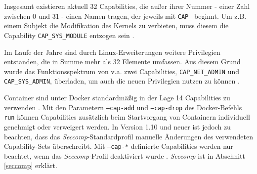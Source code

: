 \documentclass[../main.tex]{subfiles}
\begin{document}
			Insgesamt existieren aktuell 32 Capabilities, die außer ihrer Nummer - einer Zahl zwischen 0 und 31 - einen Namen tragen, der jeweils mit \texttt{CAP\_} beginnt. Um z.B. einem Subjekt die Modifikation des Kernels zu verbieten, muss diesem die Capability \texttt{CAP\_SYS\_MODULE} entzogen sein \cite[S.42]{SELinuxApparmor}.

			Im Laufe der Jahre sind durch Linux-Erweiterungen weitere Privilegien entstanden, die in Summe mehr als 32 Elemente umfassen. Aus diesem Grund wurde das Funktionsspektrum von v.a. zwei Capabilities, \texttt{CAP\_NET\_ADMIN} und \texttt{CAP\_SYS\_ADMIN}, überladen, um auch die neuen Privilegien nutzen zu können \cite[S.40f.]{SELinuxApparmor}.

			Container sind unter Docker standardmäßig in der Lage 14 Capabilities zu verwenden \cite{githubCapabilities}. Mit den Parametern \texttt{--cap-add} und \texttt{--cap-drop} des Docker-Befehls \texttt{run} können Capabilities zusätzlich beim Startvorgang von Containern individuell genehmigt oder verweigert werden. In Version 1.10 und neuer ist jedoch zu beachten, dass das \emph{Seccomp}-Standardprofil manuelle Änderungen des verwendeten Capability-Sets überschreibt. Mit \texttt{--cap-*} definierte Capabilities werden nur beachtet, wenn das \emph{Seccomp}-Profil deaktiviert wurde \cite{dockerRun}. \emph{Seccomp} ist in Abschnitt \ref{seccomp} erklärt.




\end{document}
